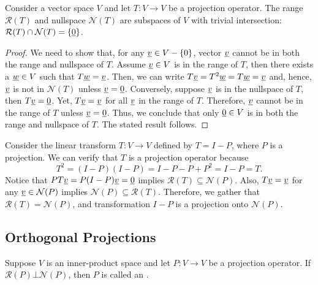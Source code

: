 \begin{theorem}
Consider a vector space $V$ and let $T \colon V \rightarrow V$ be a projection operator.
The range $\mathcal{R}(T)$ and nullspace $\mathcal{N}(T)$ are subspaces of $V$ with trivial intersection: $\mathcal{R}(T)\cap\mathcal{N}(T)=\{\underline{0}\}$.
\end{theorem}
\begin{proof}
We need to show that, for any $\underline{v} \in V - \{0\}$, vector $\underline{v}$ cannot be in both the range and nullspace of $T$.
Assume $\underline{v}\in V$ is in the range of $T$, then there exists a $\underline{w} \in V$ such that $T \underline{w} = \underline{v}$.
Then, we can write $T \underline{v} = T^2 \underline{w} = T \underline{w} = \underline{v}$ and, hence, $\underline{v}$ is not in $\mathcal{N}(T)$ unless $\underline{v} = \underline{0}$.
Conversely, suppose $\underline{v}$ is in the nullspace of $T$, then $T \underline{v} = \underline{0}$.
Yet, $T \underline{v} = \underline{v}$ for all $\underline{v}$ in the range of $T$.
Therefore, $\underline{v}$ cannot be in the range of $T$ unless $\underline{v} = \underline{0}$.
Thus, we conclude that only $\underline{0} \in V$ is in both the range and nullspace of $T$.
The stated result follows.
\end{proof}

\begin{example}
Consider the linear transform $T \colon V \rightarrow V$ defined by $T = I - P$, where $P$ is a projection.
We can verify that $T$ is a projection operator because
\[ T^2 = (I-P)(I-P) = I - P- P + P^2 = I-P = T .\]
Notice that $PT \underline{v} = P(I-P) \underline{v} = \underline{0}$ implies $\mathcal{R}(T) \subseteq \mathcal{N}(P)$.
Also, $T \underline{v} = \underline{v}$ for any $\underline{v} \in \mathcal{N}(P)$ implies $\mathcal{N}(P) \subseteq \mathcal{R}(T)$.
Therefore, we gather that $\mathcal{R}(T) = \mathcal{N}(P)$, and transformation $I-P$ is a projection onto $\mathcal{N}(P)$.
\end{example}


\subsection{Orthogonal Projections}

\begin{definition}
\label{definition:OrthogonalProjection}
Suppose $V$ is an inner-product space and let $P \colon V \rightarrow V$ be a projection operator.
If $\mathcal{R}(P) \bot \mathcal{N}(P)$, then $P$ is called an  .
\end{definition}

